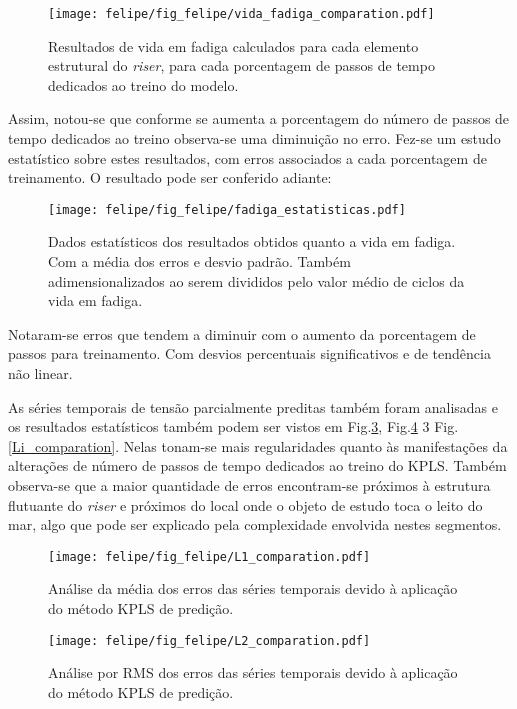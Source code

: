 \begin{figure}[!ht]
    \centering
    \texttt{[image: felipe/fig\_felipe/vida\_fadiga\_comparation.pdf]} 
    \caption{Resultados de vida em fadiga calculados para cada elemento estrutural do \emph{riser}, para cada porcentagem de passos de tempo dedicados ao treino do modelo.}
    \label{comparation}
\end{figure}

Assim, notou-se que conforme se aumenta a porcentagem do número de passos de tempo dedicados ao treino observa-se uma diminuição no erro. Fez-se um estudo estatístico sobre estes resultados, com erros associados a cada porcentagem de treinamento. O resultado pode ser conferido adiante:


\begin{figure}[!ht]
    \centering
    \texttt{[image: felipe/fig\_felipe/fadiga\_estatisticas.pdf]} 
    \caption{Dados estatísticos dos resultados obtidos quanto a vida em fadiga. Com a média dos erros e desvio padrão. Também adimensionalizados ao serem divididos pelo valor médio de ciclos da vida em fadiga.}
    \label{estatistica_valores}
\end{figure}

Notaram-se erros que tendem a diminuir com o aumento da porcentagem de passos para treinamento. Com desvios percentuais significativos e de tendência não linear.

As séries temporais de tensão parcialmente preditas também foram analisadas e os resultados estatísticos também podem ser vistos em Fig.\ref{L1_comparation}, Fig.\ref{L2_comparation} 3 Fig.\ref{Li_comparation}. Nelas tonam-se mais regularidades quanto às manifestações da alterações de número de passos de tempo dedicados ao treino do KPLS. Também observa-se que a maior quantidade de erros encontram-se próximos à estrutura flutuante do \emph{riser} e próximos do local onde o objeto de estudo toca o leito do mar, algo que pode ser explicado pela complexidade envolvida nestes segmentos.

\begin{figure}[!ht]
    \centering
    \texttt{[image: felipe/fig\_felipe/L1\_comparation.pdf]} 
    \caption{Análise da média dos erros das séries temporais devido à aplicação do método KPLS de predição.}
    \label{L1_comparation}
\end{figure}

\begin{figure}[!ht]
    \centering
    \texttt{[image: felipe/fig\_felipe/L2\_comparation.pdf]} 
    \caption{Análise por RMS dos erros das séries temporais devido à aplicação do método KPLS de predição.}
    \label{L2_comparation}
\end{figure}

